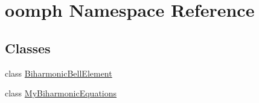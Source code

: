 \hypertarget{namespaceoomph}{}\section{oomph Namespace Reference}
\label{namespaceoomph}
\subsection*{Classes}
\begin{DoxyCompactItemize}
\item 
class \hyperlink{classoomph_1_1BiharmonicBellElement}{Biharmonic\+Bell\+Element}
\item 
class \hyperlink{classoomph_1_1MyBiharmonicEquations}{My\+Biharmonic\+Equations}
\end{DoxyCompactItemize}
